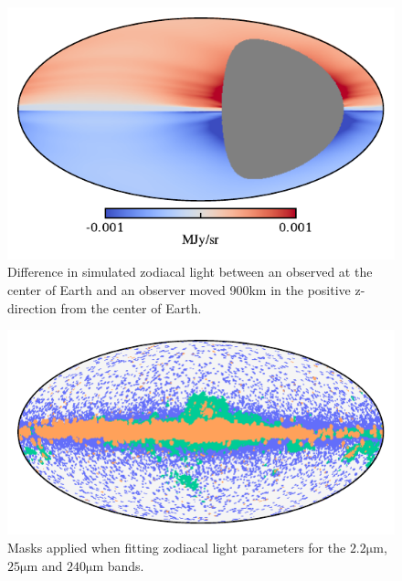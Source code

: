 \documentclass{aa}
\begin{document}
\begin{figure}
    \centering
         \includegraphics[width=\linewidth]{figs/zodi_obs_diff.pdf}
        \caption{Difference in simulated zodiacal light between an observed at the center of Earth and an observer moved 900km in the positive z-direction from the center of Earth.}
    \label{fig: z}
\end{figure}

\begin{figure}
    \centering
        \includegraphics[width=\columnwidth]{figs/mask_zodi_fitting.pdf}
        \caption{Masks applied when fitting zodiacal light parameters for the $2.2\mathrm{\mu m}$, $25\mathrm{\mu m}$ and $240\mathrm{\mu m}$ bands.}
    \label{fig:masks}
\end{figure}
\end{document}
